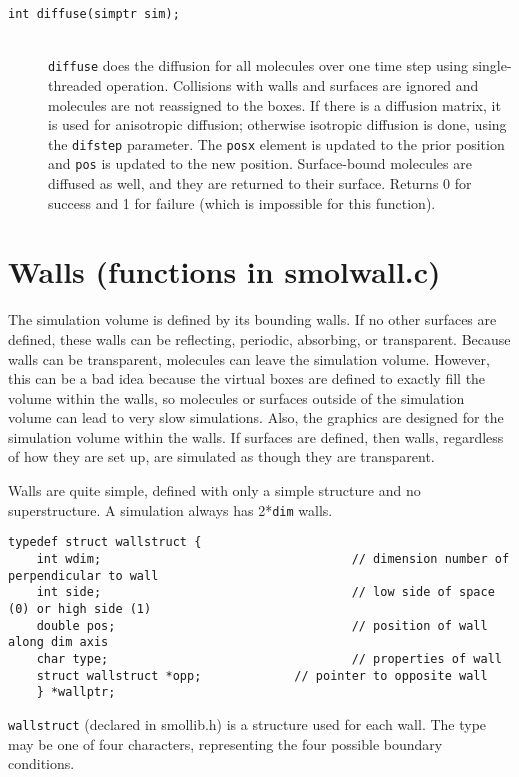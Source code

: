 \documentclass {scrbook}
\newcommand {\ttt} {\texttt}
\begin{document}
\begin{description}
\item[\ttt{int diffuse(simptr sim);}]
\hfill \\
\ttt{diffuse} does the diffusion for all molecules over one time step using single-threaded operation. Collisions with walls and surfaces are ignored and molecules are not reassigned to the boxes. If there is a diffusion matrix, it is used for anisotropic diffusion; otherwise isotropic diffusion is done, using the \ttt{difstep} parameter. The \ttt{posx} element is updated to the prior position and \ttt{pos} is updated to the new position. Surface-bound molecules are diffused as well, and they are returned to their surface. Returns 0 for success and 1 for failure (which is impossible for this function).

\end{description}

\section{Walls (functions in smolwall.c)}

The simulation volume is defined by its bounding walls. If no other surfaces are defined, these walls can be reflecting, periodic, absorbing, or transparent. Because walls can be transparent, molecules can leave the simulation volume. However, this can be a bad idea because the virtual boxes are defined to exactly fill the volume within the walls, so molecules or surfaces outside of the simulation volume can lead to very slow simulations. Also, the graphics are designed for the simulation volume within the walls. If surfaces are defined, then walls, regardless of how they are set up, are simulated as though they are transparent.

Walls are quite simple, defined with only a simple structure and no superstructure. A simulation always has 2*\ttt{dim} walls.

\begin{lstlisting}
typedef struct wallstruct {
	int wdim;									// dimension number of perpendicular to wall
	int side;									// low side of space (0) or high side (1)
	double pos;									// position of wall along dim axis
	char type;									// properties of wall
	struct wallstruct *opp; 			// pointer to opposite wall
	} *wallptr;
\end{lstlisting}

\ttt{wallstruct} (declared in smollib.h) is a structure used for each wall. The type may be one of four characters, representing the four possible boundary conditions.
\end{document}

